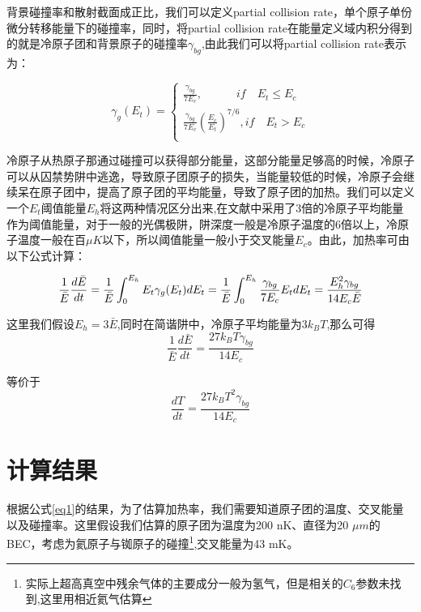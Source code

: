 \documentclass[onecolumn,a4paper,10pt,plain]{article}
\begin{document}
背景碰撞率和散射截面成正比，我们可以定义partial collision rate，单个原子单份微分转移能量下的碰撞率，同时，将partial collision rate在能量定义域内积分得到的就是冷原子团和背景原子的碰撞率$\gamma _{bg}$,由此我们可以将partial collision rate表示为：

\begin{equation}
\gamma_g (E_t)= \left\{ 
\begin{array}{l}
\frac{\gamma _{bg}}{7E_c}, \qquad \quad if  \quad E_t\leqslant E_c\\
\frac{\gamma _{bg}}{7E_c} {(\frac{E_c}{E_t})}^{7/6}, if  \quad E_t >  E_c\\
\end{array}
\right.
\end{equation}

冷原子从热原子那通过碰撞可以获得部分能量，这部分能量足够高的时候，冷原子可以从囚禁势阱中逃逸，导致原子团原子的损失，当能量较低的时候，冷原子会继续呆在原子团中，提高了原子团的平均能量，导致了原子团的加热。我们可以定义一个$E_t$阈值能量$E_h$将这两种情况区分出来,在文献\cite{mc1}中采用了3倍的冷原子平均能量作为阈值能量，对于一般的光偶极阱，阱深度一般是冷原子温度的6倍以上，冷原子温度一般在百$\mu K$以下，所以阈值能量一般小于交叉能量$E_c$。由此，加热率可由以下公式计算：

\begin{equation}
\frac{1}{\bar{E}}\frac{d\bar{E}}{dt}\\
=\frac{1}{\bar{E}}\int_{0}^{E_h}E_t\gamma_{g}(E_t)dE_t\\
=\frac{1}{\bar{E}}\int_{0}^{E_h}\frac{\gamma _{bg}}{7E_c}E_tdE_t\\
=\frac{E^2_h \gamma_{bg}}{14E_c\bar{E}}
\end{equation}

这里我们假设$E_h=3\bar{E}$,同时在简谐阱中，冷原子平均能量为$3k_BT$,那么可得
\begin{equation}
\frac{1}{\bar{E}}\frac{d\bar{E}}{dt}=\frac{27k_BT \gamma_{bg}}{14E_c}
\end{equation}

等价于
\begin{equation}\label{eq1}
\frac{dT}{dt}=\frac{27k_BT^2 \gamma_{bg}}{14E_c}
\end{equation}

\section{计算结果}

根据公式\eqref{eq1}的结果，为了估算加热率，我们需要知道原子团的温度、交叉能量以及碰撞率。这里假设我们估算的原子团为温度为200 nK、直径为20 $\mu m$的BEC，考虑为氦原子与铷原子的碰撞\footnote{实际上超高真空中残余气体的主要成分一般为氢气，但是相关的$C_6$参数未找到,这里用相近氦气估算},交叉能量为43 mK。
\end{document}
